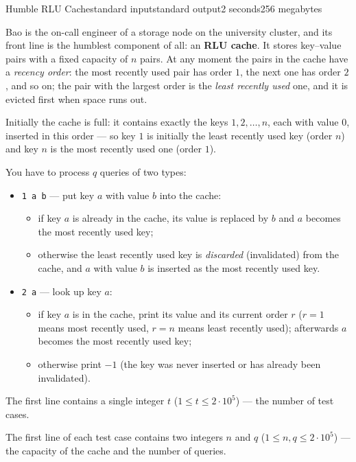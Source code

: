 \begin{problem}{Humble RLU Cache}{standard input}{standard output}{2 seconds}{256 megabytes}

Bao is the on-call engineer of a storage node on the university cluster, and its front line is the humblest component of all: an \textbf{RLU cache}. It stores key--value pairs with a fixed capacity of $n$ pairs. At any moment the pairs in the cache have a \emph{recency order}: the most recently used pair has order $1$, the next one has order $2$, and so on; the pair with the largest order is the \emph{least recently used} one, and it is evicted first when space runs out.

Initially the cache is full: it contains exactly the keys $1, 2, \ldots, n$, each with value $0$, inserted in this order --- so key $1$ is initially the least recently used key (order $n$) and key $n$ is the most recently used one (order $1$).

You have to process $q$ queries of two types:

\begin{itemize}
  \item \texttt{1 a b} --- put key $a$ with value $b$ into the cache:
    \begin{itemize}
      \item if key $a$ is already in the cache, its value is replaced by $b$ and $a$ becomes the most recently used key;
      \item otherwise the least recently used key is \emph{discarded} (invalidated) from the cache, and $a$ with value $b$ is inserted as the most recently used key.
    \end{itemize}
  \item \texttt{2 a} --- look up key $a$:
    \begin{itemize}
      \item if key $a$ is in the cache, print its value and its current order $r$ ($r = 1$ means most recently used, $r = n$ means least recently used); afterwards $a$ becomes the most recently used key;
      \item otherwise print $-1$ (the key was never inserted or has already been invalidated).
    \end{itemize}
\end{itemize}


\InputFile
The first line contains a single integer $t$ ($1 \le t \le 2 \cdot 10^5$) --- the number of test cases.

The first line of each test case contains two integers $n$ and $q$ ($1 \le n, q \le 2 \cdot 10^5$) --- the capacity of the cache and the number of queries.


\end{problem}
